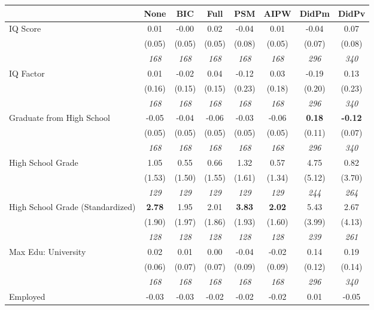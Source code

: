 \begin{tabular}{l c c c c c c c}
\toprule
 & None & BIC & Full & PSM & AIPW & DidPm & DidPv \\
\midrule
IQ Score & 0.01 & -0.00 & 0.02 & -0.04 & 0.01 & -0.04 & 0.07 \\
& (0.05) & (0.05) & (0.05) & (0.08) & (0.05) & (0.07) & (0.08) \\
& \textit{ 168 } & \textit{ 168 } & \textit{ 168 } & \textit{ 168 } & \textit{ 168 } & \textit{ 296 } & \textit{ 340 } \\
IQ Factor & 0.01 & -0.02 & 0.04 & -0.12 & 0.03 & -0.19 & 0.13 \\
& (0.16) & (0.15) & (0.15) & (0.23) & (0.18) & (0.20) & (0.23) \\
& \textit{ 168 } & \textit{ 168 } & \textit{ 168 } & \textit{ 168 } & \textit{ 168 } & \textit{ 296 } & \textit{ 340 } \\
Graduate from High School & -0.05 & -0.04 & -0.06 & -0.03 & -0.06 & \textbf{ 0.18 } & \textbf{ -0.12 } \\
& (0.05) & (0.05) & (0.05) & (0.05) & (0.05) & (0.11) & (0.07) \\
& \textit{ 168 } & \textit{ 168 } & \textit{ 168 } & \textit{ 168 } & \textit{ 168 } & \textit{ 296 } & \textit{ 340 } \\
High School Grade & 1.05 & 0.55 & 0.66 & 1.32 & 0.57 & 4.75 & 0.82 \\
& (1.53) & (1.50) & (1.55) & (1.61) & (1.34) & (5.12) & (3.70) \\
& \textit{ 129 } & \textit{ 129 } & \textit{ 129 } & \textit{ 129 } & \textit{ 129 } & \textit{ 244 } & \textit{ 264 } \\
High School Grade (Standardized) & \textbf{ 2.78 } & 1.95 & 2.01 & \textbf{3.83} & \textbf{2.02} & 5.43 & 2.67 \\
& (1.90) & (1.97) & (1.86) & (1.93) & (1.60) & (3.99) & (4.13) \\
& \textit{ 128 } & \textit{ 128 } & \textit{ 128 } & \textit{ 128 } & \textit{ 128 } & \textit{ 239 } & \textit{ 261 } \\
Max Edu: University & 0.02 & 0.01 & 0.00 & -0.04 & -0.02 & 0.14 & 0.19 \\
& (0.06) & (0.07) & (0.07) & (0.09) & (0.09) & (0.12) & (0.14) \\
& \textit{ 168 } & \textit{ 168 } & \textit{ 168 } & \textit{ 168 } & \textit{ 168 } & \textit{ 296 } & \textit{ 340 } \\
Employed & -0.03 & -0.03 & -0.02 & -0.02 & -0.02 & 0.01 & -0.05 \\

\end{tabular}
